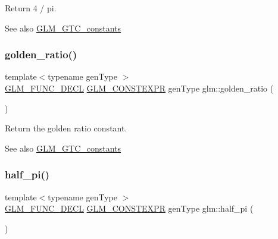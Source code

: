 Return 4 / pi. \begin{DoxySeeAlso}{See also}
\mbox{\hyperlink{group__gtc__constants}{G\+L\+M\+\_\+\+G\+T\+C\+\_\+constants}} 
\end{DoxySeeAlso}
\mbox{\label{group__gtc__constants_ga748cf8642830657c5b7eae04d0a80899}} 
\subsubsection{\texorpdfstring{golden\+\_\+ratio()}{golden\_ratio()}}
{\footnotesize\ttfamily template$<$typename gen\+Type $>$ \\
\mbox{\hyperlink{setup_8hpp_ab2d052de21a70539923e9bcbf6e83a51}{G\+L\+M\+\_\+\+F\+U\+N\+C\+\_\+\+D\+E\+CL}} \mbox{\hyperlink{setup_8hpp_a08b807947b47031d3a511f03f89645ad}{G\+L\+M\+\_\+\+C\+O\+N\+S\+T\+E\+X\+PR}} gen\+Type glm\+::golden\+\_\+ratio (\begin{DoxyParamCaption}{ }\end{DoxyParamCaption})}

Return the golden ratio constant. \begin{DoxySeeAlso}{See also}
\mbox{\hyperlink{group__gtc__constants}{G\+L\+M\+\_\+\+G\+T\+C\+\_\+constants}} 
\end{DoxySeeAlso}
\mbox{\label{group__gtc__constants_ga0c36b41d462e45641faf7d7938948bac}} 
\subsubsection{\texorpdfstring{half\+\_\+pi()}{half\_pi()}}
{\footnotesize\ttfamily template$<$typename gen\+Type $>$ \\
\mbox{\hyperlink{setup_8hpp_ab2d052de21a70539923e9bcbf6e83a51}{G\+L\+M\+\_\+\+F\+U\+N\+C\+\_\+\+D\+E\+CL}} \mbox{\hyperlink{setup_8hpp_a08b807947b47031d3a511f03f89645ad}{G\+L\+M\+\_\+\+C\+O\+N\+S\+T\+E\+X\+PR}} gen\+Type glm\+::half\+\_\+pi (\begin{DoxyParamCaption}{ }\end{DoxyParamCaption})}


